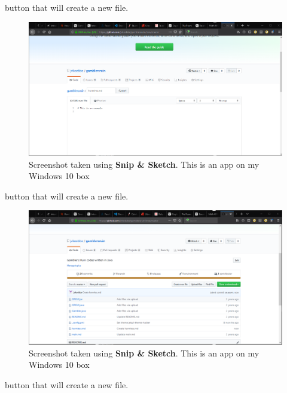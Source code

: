 \documentclass[10pt,fleqn]{article}
\begin{document}
\eject
button that will create a new file.
\vfill
\begin{figure}[h]
\centering
\includegraphics{../images/github_08.png}
\caption{{Screenshot} taken using {\bf Snip \& Sketch}. This is an app on
         my Windows 10 box}
\end{figure}
\eject
button that will create a new file.
\vfill
\begin{figure}[h]
\centering
\includegraphics{../images/github_09.png}
\caption{{Screenshot} taken using {\bf Snip \& Sketch}. This is an app on
         my Windows 10 box}
\end{figure}
\eject
button that will create a new file.
\vfill
\end{document}
